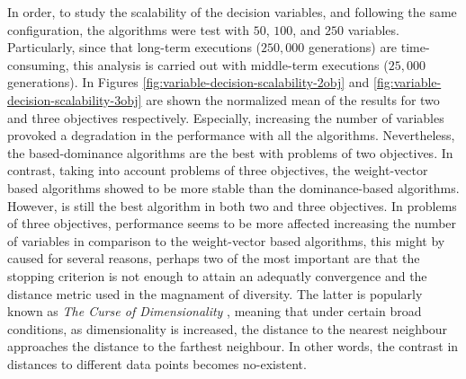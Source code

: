 In order, to study the scalability of the decision variables, and following the same configuration, the algorithms were test with $50$, $100$, and $250$ variables.
%
Particularly, since that long-term executions ($250,000$ generations) are time-consuming, this analysis is carried out with middle-term executions ($25,000$ generations).
%
In Figures \ref{fig:variable-decision-scalability-2obj} and \ref{fig:variable-decision-scalability-3obj} are shown the normalized mean of the \HV{} results for two and three objectives respectively.
%
Especially, increasing the number of variables provoked a degradation in the performance with all the algorithms.
%
Nevertheless, the based-dominance algorithms are the best with problems of two objectives.
%
In contrast, taking into account problems of three objectives, the weight-vector based algorithms showed to be more stable than the dominance-based algorithms.
%
%
However, \VSDMOEA{} is still the best algorithm in both two and three objectives.
% 
In problems of three objectives, \VSDMOEA{} performance seems to be more affected increasing the number of variables in comparison to the weight-vector based algorithms, this might by caused for several reasons, perhaps two of the most important are that the stopping criterion is not enough to attain an adequatly convergence and the distance metric used in the magnament of diversity.
%
The latter is popularly known as \textit{The Curse of Dimensionality} \cite{trunk1979problem, beyer1999nearest}, meaning that under certain broad conditions, as dimensionality is increased, the distance to the nearest neighbour approaches the distance to the farthest neighbour.
%
In other words, the contrast in distances to different data points becomes no-existent.


%

%




